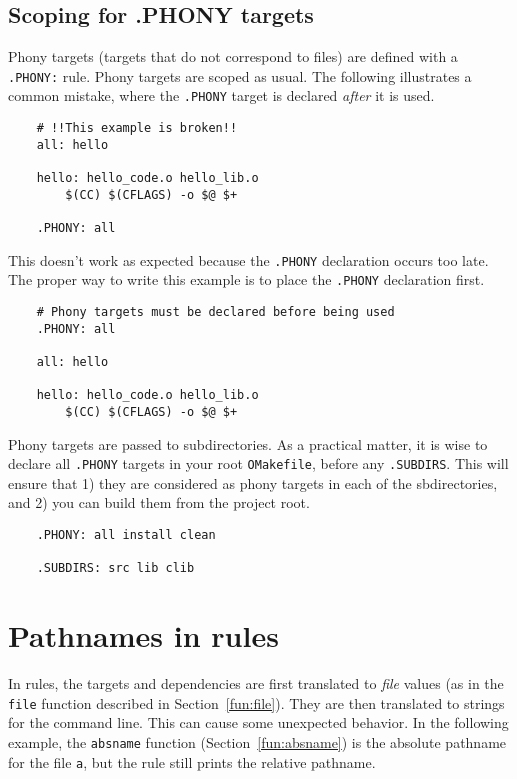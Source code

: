 \subsection{Scoping for .PHONY targets}

Phony targets (targets that do not correspond to files) are defined with a \verb+.PHONY:+ rule.
Phony targets are scoped as usual.  The following illustrates a common mistake, where the
\verb+.PHONY+ target is declared \emph{after} it is used.

\begin{verbatim}
    # !!This example is broken!!
    all: hello

    hello: hello_code.o hello_lib.o
        $(CC) $(CFLAGS) -o $@ $+

    .PHONY: all
\end{verbatim}

This doesn't work as expected because the \verb+.PHONY+ declaration occurs too late.  The proper way
to write this example is to place the \verb+.PHONY+ declaration first.

\begin{verbatim}
    # Phony targets must be declared before being used
    .PHONY: all

    all: hello

    hello: hello_code.o hello_lib.o
        $(CC) $(CFLAGS) -o $@ $+
\end{verbatim}

Phony targets are passed to subdirectories.  As a practical matter, it is wise to declare all
\verb+.PHONY+ targets in your root \verb+OMakefile+, before any \verb+.SUBDIRS+.  This will ensure
that 1) they are considered as phony targets in each of the sbdirectories, and 2) you can build them
from the project root.

\begin{verbatim}
    .PHONY: all install clean

    .SUBDIRS: src lib clib
\end{verbatim}

\section{Pathnames in rules}

In rules, the targets and dependencies are first translated to \emph{file} values (as in the
\verb+file+ function described in Section~\ref{fun:file}).  They are then translated to strings for the command line.
This can cause some unexpected behavior.  In the following example, the \verb+absname+
function (Section~\ref{fun:absname}) is the absolute pathname for the file \verb+a+, but the rule still prints
the relative pathname.

